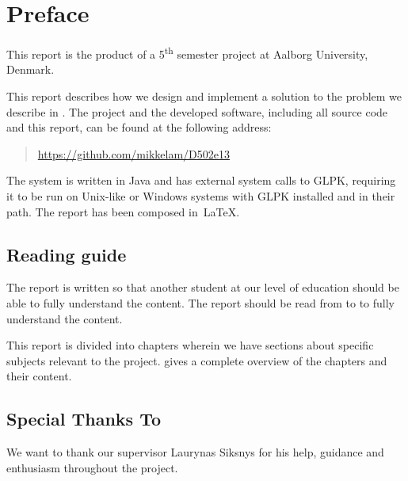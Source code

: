 \section*{Preface}\label{sec:preface}
This report is the product of a 5\textsuperscript{th} semester project at Aalborg University, Denmark. 

This report describes how we design and implement a solution to the problem we describe in . The project and the developed software, including all source code and this report, can be found at the following address:

\begin{quote}
  \url{https://github.com/mikkelam/D502e13}  
\end{quote}

The system is written in Java and has external system calls to GLPK, requiring it to be run on Unix-like or Windows systems with GLPK installed and in their path. The report has been composed in~\LaTeX.

\subsection*{Reading guide}
The report is written so that another student at our level of education should be able to fully understand the content. The report should be read from  to  to fully understand the content. 

This report is divided into chapters wherein we have sections about specific subjects relevant to the project.  gives a complete overview of the chapters and their content.

\subsection*{Special Thanks To}
We want to thank our supervisor Laurynas Siksnys for his help, guidance and enthusiasm throughout the project.  
